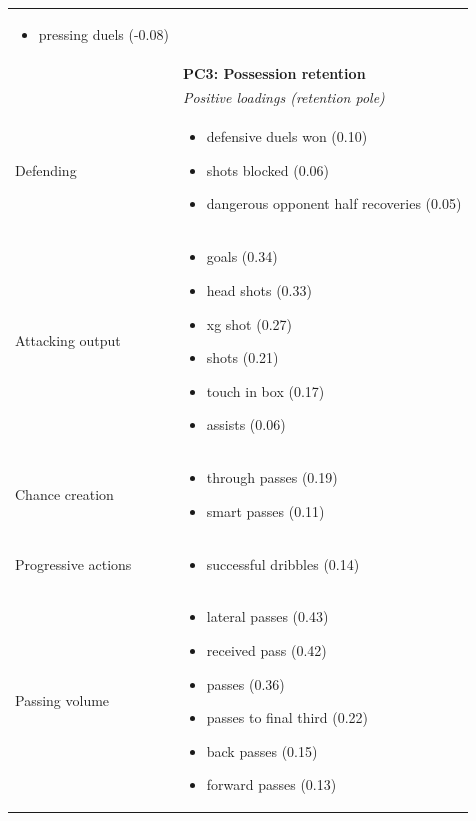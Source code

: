 \begin{longtable}{p{2.6cm}p{13cm}}
\begin{itemize}[nosep,leftmargin=1.1em,topsep=1pt]
    \item pressing duels (-0.08)
  \end{itemize}\\[8pt]
 & \rule{0pt}{2.2ex}\textbf{PC3: Possession retention}\\
 & \textit{Positive loadings (retention pole)}\\
Defending & \begin{itemize}[nosep,leftmargin=1.1em,topsep=1pt]
    \item defensive duels won (0.10)
    \item shots blocked (0.06)
    \item dangerous opponent half recoveries (0.05)
  \end{itemize}\\
Attacking output & \begin{itemize}[nosep,leftmargin=1.1em,topsep=1pt]
    \item goals (0.34)
    \item head shots (0.33)
    \item xg shot (0.27)
    \item shots (0.21)
    \item touch in box (0.17)
    \item assists (0.06)
  \end{itemize}\\
Chance creation & \begin{itemize}[nosep,leftmargin=1.1em,topsep=1pt]
    \item through passes (0.19)
    \item smart passes (0.11)
  \end{itemize}\\
Progressive actions & \begin{itemize}[nosep,leftmargin=1.1em,topsep=1pt]
    \item successful dribbles (0.14)
  \end{itemize}\\
Passing volume & \begin{itemize}[nosep,leftmargin=1.1em,topsep=1pt]
    \item lateral passes (0.43)
    \item received pass (0.42)
    \item passes (0.36)
    \item passes to final third (0.22)
    \item back passes (0.15)
    \item forward passes (0.13)
  \end{itemize}\\

\end{longtable}
